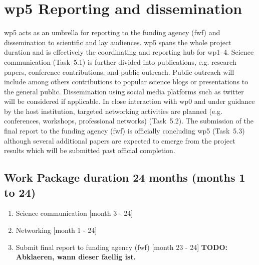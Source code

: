 \section{\gls{wp}5 Reporting and dissemination}
\label{sec:wp5}
\gls{wp}5 acts as an umbrella for reporting to the funding agency (\gls{fwf}) and dissemination to scientific and lay audiences. \gls{wp}5 spans the whole project duration and is effectively the coordinating and reporting hub for \gls{wp}1--4. Science communication (Task~5.1) is further divided into publications, e.g. research papers, conference contributions, and public outreach. Public outreach will include among others contributions to popular science blogs or presentations to the general public. Dissemination using social media platforms such as twitter will be considered if applicable. In close interaction with \gls{wp}0 and under guidance by the host institution, targeted networking activities are planned (e.g. conferences, workshops, professional networks) (Task~5.2). The submission of the final report to the funding agency (\gls{fwf}) is officially concluding \gls{wp}5 (Task~5.3) although several additional papers are expected to emerge from the project results which will be submitted past official completion.

\subsection*{Work Package duration 24 months (months 1 to 24)}
\begin{enumerate}[start=1,label={T5.\arabic*}]
  \itemsep0pt
\item Science communication \hfill [month 3 - 24]
\item Networking \hfill [month 1 - 24]
\item Submit final report  to funding agency (\gls{fwf}) \hfill [month 23 - 24] \textbf{TODO: Abklaeren, wann dieser faellig ist.}
\end{enumerate}
